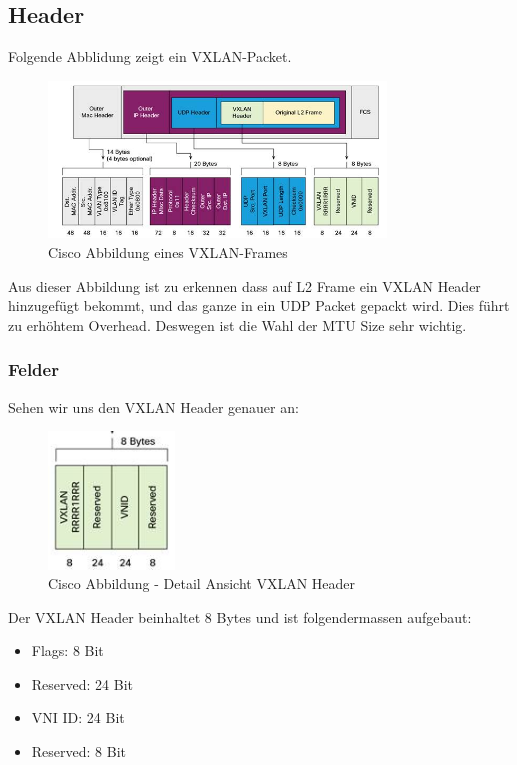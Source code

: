 \documentclass[a4,12pt]{scrartcl}
\begin{document}
\subsection{Header}
Folgende Abblidung zeigt ein VXLAN-Packet. 
\begin{figure} [H]
	\begin{center}
	\includegraphics[width=0.80\textwidth]{./pictures/vxlan_header.png}
	\caption{Cisco Abbildung eines VXLAN-Frames}
	\label{x}
	\end{center}
\end{figure}
\noindent Aus dieser Abbildung ist zu erkennen dass auf L2 Frame ein VXLAN Header hinzugefügt bekommt, und das ganze in ein UDP Packet gepackt wird. Dies führt zu erhöhtem Overhead. Deswegen ist die Wahl der MTU Size sehr wichtig. 

\subsubsection{Felder}
Sehen wir uns den VXLAN Header genauer an: 
\begin{figure} [H]
	\begin{center}
	\includegraphics[width=0.30\textwidth]{./pictures/vxlan_header_detail.png}
	\caption{Cisco Abbildung - Detail Ansicht VXLAN Header}
	\label{x}
	\end{center}
\end{figure}

Der VXLAN Header beinhaltet 8 Bytes und ist folgendermassen aufgebaut: 
\begin{itemize}
\item Flags: 8 Bit 
\item Reserved: 24 Bit 
\item VNI ID: 24 Bit 
\item Reserved: 8 Bit 
\end{itemize}
\end{document}

